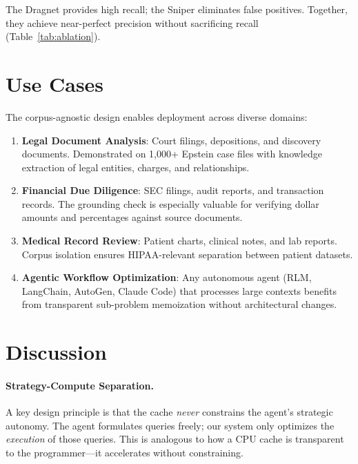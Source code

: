 \documentclass[11pt,twocolumn]{article}
\begin{document}
The Dragnet provides high recall; the Sniper eliminates false positives. Together, they achieve near-perfect precision without sacrificing recall (Table~\ref{tab:ablation}).

\section{Use Cases}
\label{sec:usecases}

The corpus-agnostic design enables deployment across diverse domains:

\begin{enumerate}
    \item \textbf{Legal Document Analysis}: Court filings, depositions, and discovery documents. Demonstrated on 1,000+ Epstein case files with knowledge extraction of legal entities, charges, and relationships.

    \item \textbf{Financial Due Diligence}: SEC filings, audit reports, and transaction records. The grounding check is especially valuable for verifying dollar amounts and percentages against source documents.

    \item \textbf{Medical Record Review}: Patient charts, clinical notes, and lab reports. Corpus isolation ensures HIPAA-relevant separation between patient datasets.

    \item \textbf{Agentic Workflow Optimization}: Any autonomous agent (RLM, LangChain, AutoGen, Claude Code) that processes large contexts benefits from transparent sub-problem memoization without architectural changes.
\end{enumerate}

\section{Discussion}
\label{sec:discussion}

\paragraph{Strategy-Compute Separation.}
A key design principle is that the cache \textit{never} constrains the agent's strategic autonomy. The agent formulates queries freely; our system only optimizes the \textit{execution} of those queries. This is analogous to how a CPU cache is transparent to the programmer---it accelerates without constraining.
\end{document}
